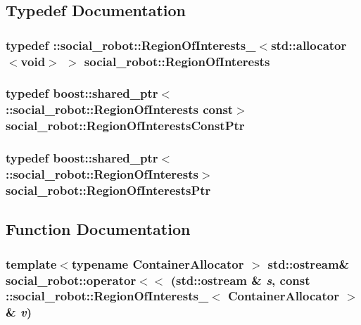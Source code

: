 \subsection{Typedef Documentation}
\hypertarget{namespacesocial__robot_aa3dc27f4d1ca77fde69181e4b8f03a12}{
\subsubsection[{RegionOfInterests}]{\setlength{\rightskip}{0pt plus 5cm}typedef ::{\bf social\_\-robot::RegionOfInterests\_\-}$<$std::allocator$<$void$>$ $>$ {\bf social\_\-robot::RegionOfInterests}}}
\label{namespacesocial__robot_aa3dc27f4d1ca77fde69181e4b8f03a12}
\hypertarget{namespacesocial__robot_ac7a635f483fd71d5452d0203a21cacde}{
\subsubsection[{RegionOfInterestsConstPtr}]{\setlength{\rightskip}{0pt plus 5cm}typedef boost::shared\_\-ptr$<$ ::{\bf social\_\-robot::RegionOfInterests} const$>$ {\bf social\_\-robot::RegionOfInterestsConstPtr}}}
\label{namespacesocial__robot_ac7a635f483fd71d5452d0203a21cacde}
\hypertarget{namespacesocial__robot_aa7f6c38c555e8e4e3122a84f92ee1877}{
\subsubsection[{RegionOfInterestsPtr}]{\setlength{\rightskip}{0pt plus 5cm}typedef boost::shared\_\-ptr$<$ ::{\bf social\_\-robot::RegionOfInterests}$>$ {\bf social\_\-robot::RegionOfInterestsPtr}}}
\label{namespacesocial__robot_aa7f6c38c555e8e4e3122a84f92ee1877}


\subsection{Function Documentation}
\hypertarget{namespacesocial__robot_a10b77f02b388005a3caf2c530acdbac0}{
\subsubsection[{operator$<$$<$}]{\setlength{\rightskip}{0pt plus 5cm}template$<$typename ContainerAllocator $>$ std::ostream\& social\_\-robot::operator$<$$<$ (std::ostream \& {\em s}, \/  const ::{\bf social\_\-robot::RegionOfInterests\_\-}$<$ ContainerAllocator $>$ \& {\em v})}}
\label{namespacesocial__robot_a10b77f02b388005a3caf2c530acdbac0}
